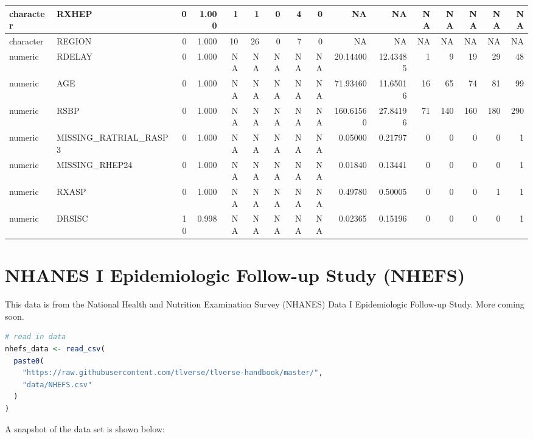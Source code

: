 \documentclass[12pt, krantz2,]{krantz}
\theoremstyle{definition}
\theoremstyle{definition}
\theoremstyle{definition}
\newcommand{\1}{\mathbbm{1}}
\begin{document}
\begin{tabular}{l|l|r|r|r|r|r|r|r|r|r|r|r|r|r|r}
\hline
character & RXHEP & 0 & 1.000 & 1 & 1 & 0 & 4 & 0 & NA & NA & NA & NA & NA & NA & NA\\
\hline
character & REGION & 0 & 1.000 & 10 & 26 & 0 & 7 & 0 & NA & NA & NA & NA & NA & NA & NA\\
\hline
numeric & RDELAY & 0 & 1.000 & NA & NA & NA & NA & NA & 20.14400 & 12.43485 & 1 & 9 & 19 & 29 & 48\\
\hline
numeric & AGE & 0 & 1.000 & NA & NA & NA & NA & NA & 71.93460 & 11.65016 & 16 & 65 & 74 & 81 & 99\\
\hline
numeric & RSBP & 0 & 1.000 & NA & NA & NA & NA & NA & 160.61560 & 27.84196 & 71 & 140 & 160 & 180 & 290\\
\hline
numeric & MISSING\_RATRIAL\_RASP3 & 0 & 1.000 & NA & NA & NA & NA & NA & 0.05000 & 0.21797 & 0 & 0 & 0 & 0 & 1\\
\hline
numeric & MISSING\_RHEP24 & 0 & 1.000 & NA & NA & NA & NA & NA & 0.01840 & 0.13441 & 0 & 0 & 0 & 0 & 1\\
\hline
numeric & RXASP & 0 & 1.000 & NA & NA & NA & NA & NA & 0.49780 & 0.50005 & 0 & 0 & 0 & 1 & 1\\
\hline
numeric & DRSISC & 10 & 0.998 & NA & NA & NA & NA & NA & 0.02365 & 0.15196 & 0 & 0 & 0 & 0 & 1\\
\hline
\end{tabular}

\hypertarget{NHEFS}{%
\section{NHANES I Epidemiologic Follow-up Study (NHEFS)}\label{NHEFS}}

This data is from the National Health and Nutrition Examination Survey (NHANES)
Data I Epidemiologic Follow-up Study. More coming soon.

\begin{lstlisting}[language=R]
# read in data
nhefs_data <- read_csv(
  paste0(
    "https://raw.githubusercontent.com/tlverse/tlverse-handbook/master/",
    "data/NHEFS.csv"
  )
)
\end{lstlisting}

A snapshot of the data set is shown below:
\end{document}

